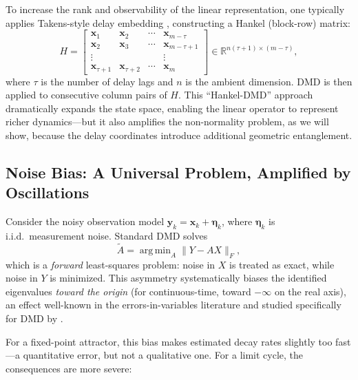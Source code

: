 \documentclass[12pt]{article}
\newcommand{\R}{\mathbb{R}}
\newcommand{\norm}[1]{\lVert #1 \rVert}
\newcommand{\Atilde}{\tilde{A}}
\DeclareMathOperator*{\argmin}{arg\,min}
\begin{document}
To increase the rank and observability of the linear representation,
one typically applies Takens-style delay embedding
\citep{takens1981detecting, brunton2017chaos}, constructing a Hankel
(block-row) matrix:
\begin{equation}
  H = \begin{bmatrix}
    \bm{x}_1 & \bm{x}_2 & \cdots & \bm{x}_{m-\tau} \\
    \bm{x}_2 & \bm{x}_3 & \cdots & \bm{x}_{m-\tau+1} \\
    \vdots & & & \vdots \\
    \bm{x}_{\tau+1} & \bm{x}_{\tau+2} & \cdots & \bm{x}_m
  \end{bmatrix}
  \in \R^{n(\tau+1) \times (m-\tau)},
  \label{eq:hankel}
\end{equation}
where $\tau$ is the number of delay lags and $n$ is the ambient dimension.
DMD is then applied to consecutive column pairs of $H$. This ``Hankel-DMD''
approach dramatically expands the state space, enabling the linear operator
to represent richer dynamics---but it also amplifies the non-normality
problem, as we will show, because the delay coordinates introduce
additional geometric entanglement.

\subsection{Noise Bias: A Universal Problem, Amplified by Oscillations}
\label{sec:noise_bias}

Consider the noisy observation model $\bm{y}_k = \bm{x}_k + \bm{\eta}_k$,
where $\bm{\eta}_k$ is i.i.d.\ measurement noise. Standard DMD solves
\begin{equation}
  \Atilde = \argmin_A \norm{Y - A X}_F,
  \label{eq:dmd_ls}
\end{equation}
which is a \emph{forward} least-squares problem: noise in $X$ is treated as
exact, while noise in $Y$ is minimized. This asymmetry systematically biases
the identified eigenvalues \emph{toward the origin} (for continuous-time,
toward $-\infty$ on the real axis), an effect well-known in the
errors-in-variables literature \citep{fuller1987measurement} and studied
specifically for DMD by \citet{dawson2016characterizing, hemati2017biasing}.

For a fixed-point attractor, this bias makes estimated decay rates slightly
too fast---a quantitative error, but not a qualitative one. For a limit
cycle, the consequences are more severe:
\end{document}
